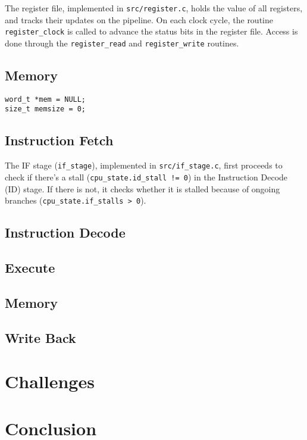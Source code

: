 \documentclass[]{IEEEtran}
\begin{document}
The register file, implemented in \verb|src/register.c|, holds the value of all
registers, and tracks their updates on the pipeline. On each clock cycle, the
routine \verb|register_clock| is called to advance the status bits in the
register file. Access is done through the \verb|register_read| and
\verb|register_write| routines.



\subsection{Memory}

\begin{verbatim}
word_t *mem = NULL;
size_t memsize = 0;
\end{verbatim}

\subsection{Instruction Fetch}

The IF stage (\verb|if_stage|), implemented in \verb|src/if_stage.c|, first proceeds to check if
there's a stall (\verb|cpu_state.id_stall != 0|) in the Instruction Decode (ID)
stage. If there is not, it checks whether it is stalled because of ongoing
branches (\verb|cpu_state.if_stalls > 0|).



\subsection{Instruction Decode}



\subsection{Execute}



\subsection{Memory}



\subsection{Write Back}



\section{Challenges}



\section{Conclusion}
\end{document}
